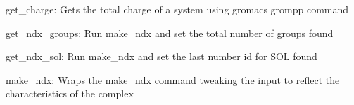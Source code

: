\documentclass[letterpaper,10pt,english]{sphinxmanual}
\begin{document}
\begin{fulllineitems}
\begin{fulllineitems}
\end{fulllineitems}


\begin{fulllineitems}
\label{\detokenize{gromacs:gromacs.Gromacs.get_charge}}
\pysigstartsignatures
{}
\pysigstopsignatures
\sphinxAtStartPar
get\_charge: Gets the total charge of a system using gromacs grompp command

\end{fulllineitems}


\begin{fulllineitems}
\label{\detokenize{gromacs:gromacs.Gromacs.get_ndx_groups}}
\pysigstartsignatures
{}
\pysigstopsignatures
\sphinxAtStartPar
get\_ndx\_groups: Run make\_ndx and set the total number of groups found

\end{fulllineitems}


\begin{fulllineitems}
\label{\detokenize{gromacs:gromacs.Gromacs.get_ndx_sol}}
\pysigstartsignatures
{}
\pysigstopsignatures
\sphinxAtStartPar
get\_ndx\_sol: Run make\_ndx and set the last number id for SOL found

\end{fulllineitems}


\begin{fulllineitems}
\label{\detokenize{gromacs:gromacs.Gromacs.make_ndx}}
\pysigstartsignatures
{}
\pysigstopsignatures
\sphinxAtStartPar
make\_ndx: Wraps the make\_ndx command tweaking the input to reflect the
characteristics of the complex


\end{fulllineitems}
\end{fulllineitems}
\end{document}
